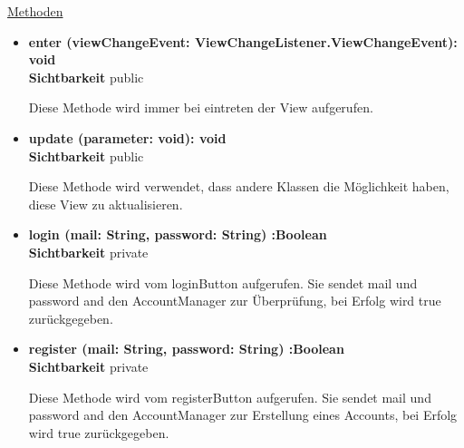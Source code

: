 \underline{Methoden}
\begin{itemize}
\itemsep0pt
\item \textbf{enter (viewChangeEvent: ViewChangeListener.ViewChangeEvent): void}\hfill\\
\textbf{Sichtbarkeit} public

Diese Methode wird immer bei eintreten der View aufgerufen.

\item \textbf{update (parameter: void): void}\hfill\\
\textbf{Sichtbarkeit} public

Diese Methode wird verwendet, dass andere Klassen die Möglichkeit haben, diese View zu aktualisieren.


\item \textbf{login (mail: String, password: String) :Boolean} \hfill\\ 
\textbf{Sichtbarkeit} private

Diese Methode wird vom loginButton aufgerufen. Sie sendet mail und password and den AccountManager zur Überprüfung, bei Erfolg wird true zurückgegeben.

\item \textbf{register (mail: String, password: String) :Boolean}\hfill\\
\textbf{Sichtbarkeit} private

Diese Methode wird vom registerButton aufgerufen. Sie sendet mail und password and den AccountManager zur Erstellung eines Accounts, bei Erfolg wird true zurückgegeben.

\end{itemize}
